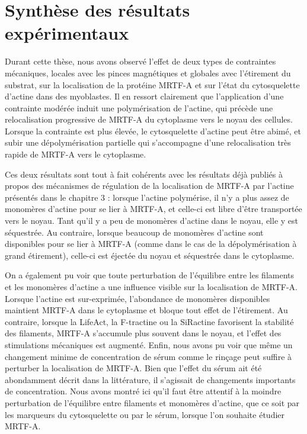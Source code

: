\section{Synthèse des résultats expérimentaux}

Durant cette thèse, nous avons observé l'effet de deux types de contraintes mécaniques, locales avec les pinces magnétiques et globales avec l'étirement du substrat, sur la localisation de la protéine MRTF-A et sur l'état du cytosquelette d'actine dans des myoblastes. 
Il en ressort clairement que l'application d'une contrainte modérée induit une polymérisation de l'actine, qui précède une relocalisation progressive de MRTF-A du cytoplasme vers le noyau des cellules. Lorsque la contrainte est plus élevée, le cytosquelette d'actine peut être abimé, et subir une dépolymérisation partielle qui s'accompagne d'une relocalisation très rapide de MRTF-A vers le cytoplasme. 

Ces deux résultats sont tout à fait cohérents avec les résultats déjà publiés à propos des mécanismes de régulation de la localisation de MRTF-A par l'actine présentés dans le chapitre 3 : lorsque l'actine polymérise, il n'y a plus assez de monomères d'actine pour se lier à MRTF-A, et celle-ci est libre d'être transportée vers le noyau. Tant qu'il y a peu de monomères d'actine dans le noyau, elle y est séquestrée. Au contraire, lorsque beaucoup de monomères d'actine sont disponibles pour se lier à MRTF-A (comme dans le cas de la dépolymérisation à grand étirement), celle-ci est éjectée du noyau et séquestrée dans le cytoplasme. 

On a également pu voir que toute perturbation de l'équilibre entre les filaments et les monomères d'actine a une influence visible sur la localisation de MRTF-A. Lorsque l'actine est sur-exprimée, l'abondance de monomères disponibles maintient MRTF-A dans le cytoplasme et bloque tout effet de l'étirement. Au contraire, lorsque la LifeAct, la F-tractine ou la SiRactine favorisent la stabilité des filaments, MRTF-A s'accumule plus souvent dans le noyau, et l'effet des stimulations mécaniques est augmenté. Enfin, nous avons pu voir que même un changement minime de concentration de sérum comme le rinçage peut suffire à perturber la localisation de MRTF-A. Bien que l'effet du sérum ait été abondamment décrit dans la littérature, il s'agissait de changements importants de concentration. Nous avons montré ici qu'il faut être attentif à la moindre perturbation de l'équilibre entre filaments et monomères d'actine, que ce soit par les marqueurs du cytosquelette ou par le sérum, lorsque l'on souhaite étudier MRTF-A. 

